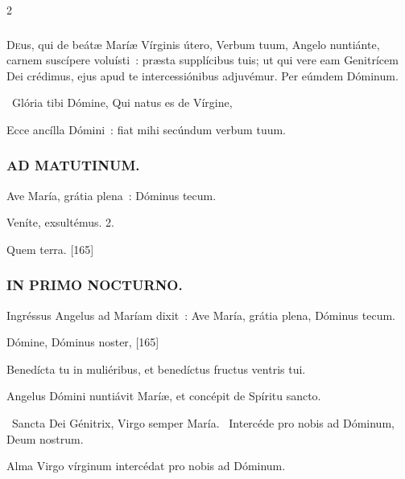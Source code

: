 \documentclass[9pt,twoside]{extarticle}
\begin{document}
\begin{multicols}{2}
\subsubsection*{\center {}}
\lettrine{D}eus, qui de beátæ Maríæ Vírginis útero, Verbum tuum, Angelo nuntiánte, carnem suscípere voluísti~: præsta supplícibus tuis; ut qui vere eam Genitrícem Dei crédimus, ejus apud te intercessiónibus adjuvémur. Per eúmdem Dóminum.

\begin{tightlist}{}
\item {}~Glória tibi Dómine, Qui natus es de Vírgine, 
\item {} Ecce ancílla Dómini~: fiat mihi secúndum verbum tuum.
\end{tightlist}

\subsubsection*{\center \textsc{AD MATUTINUM.}}
\begin{tightlist}{}
\item {} Ave María, grátia plena~: \textred{*} Dóminus tecum.
\item {} Veníte, exsultémus. 2.
\item {} Quem terra. [165]
\end{tightlist}

\subsubsection*{\center \textsc{IN PRIMO NOCTURNO.}}
\begin{tightlist}{}
\item {} Ingréssus Angelus ad Maríam dixit~: Ave María, grátia plena, Dóminus tecum.
\item {} Dómine, Dóminus noster,  [165]
\item {} Benedícta tu in muliéribus, et benedíctus fructus ventris tui.
\item {} Angelus Dómini nuntiávit Maríæ, et concépit de Spíritu sancto.
\item {}~Sancta Dei Génitrix, Virgo semper María. ~Intercéde pro nobis ad Dóminum, Deum nostrum.
\item {}
\item {\small {} Alma Virgo vírginum intercédat pro nobis ad Dóminum.}
\end{tightlist}


\end{multicols}
\end{document}
